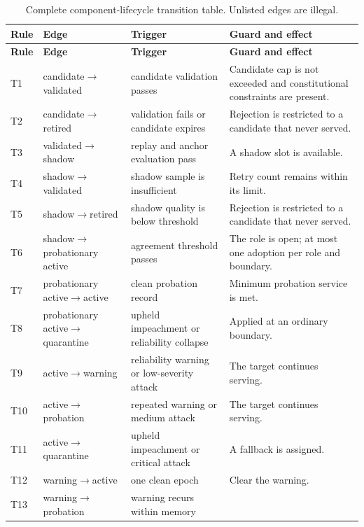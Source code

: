\small
\begin{longtable}{@{}p{}p{}p{}p{}@{}}
  \caption{Complete component-lifecycle transition table. Unlisted edges
  are illegal.}\label{tab:component-transitions}\\
  \toprule
  \textbf{Rule} & \textbf{Edge} & \textbf{Trigger} & \textbf{Guard and effect} \\
  \midrule
  \endfirsthead
  \toprule
  \textbf{Rule} & \textbf{Edge} & \textbf{Trigger} & \textbf{Guard and effect} \\
  \midrule
  \endhead
  T1 & candidate$\rightarrow$validated & candidate validation passes &
    Candidate cap is not exceeded and constitutional constraints are present.\\
  T2 & candidate$\rightarrow$retired & validation fails or candidate expires &
    Rejection is restricted to a candidate that never served.\\
  T3 & validated$\rightarrow$shadow & replay and anchor evaluation pass &
    A shadow slot is available.\\
  T4 & shadow$\rightarrow$validated & shadow sample is insufficient &
    Retry count remains within its limit.\\
  T5 & shadow$\rightarrow$retired & shadow quality is below threshold &
    Rejection is restricted to a candidate that never served.\\
  T6 & shadow$\rightarrow$probationary active & agreement threshold passes &
    The role is open; at most one adoption per role and boundary.\\
  T7 & probationary active$\rightarrow$active & clean probation record &
    Minimum probation service is met.\\
  T8 & probationary active$\rightarrow$quarantine & upheld impeachment or reliability collapse &
    Applied at an ordinary boundary.\\
  T9 & active$\rightarrow$warning & reliability warning or low-severity attack &
    The target continues serving.\\
  T10 & active$\rightarrow$probation & repeated warning or medium attack &
    The target continues serving.\\
  T11 & active$\rightarrow$quarantine & upheld impeachment or critical attack &
    A fallback is assigned.\\
  T12 & warning$\rightarrow$active & one clean epoch & Clear the warning.\\
  T13 & warning$\rightarrow$probation & warning recurs within memory &

\end{longtable}

